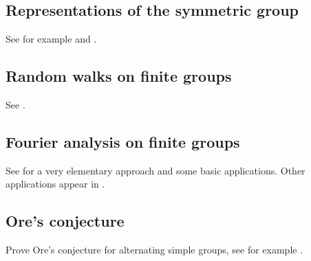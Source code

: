 \subsection*{Representations of the symmetric group}

See for example \cite[\S10]{MR2867444} and 
\cite{MR1153249}. 

\subsection*{Random walks on finite groups}

See \cite[\S11]{MR2867444}.

\subsection*{Fourier analysis on finite groups}

See \cite[\S5]{MR2867444} for a very elementary approach and some
basic applications. Other applications 
appear in \cite{MR1695775}.

\subsection*{Ore's conjecture}

Prove Ore's conjecture for alternating simple groups,
see for example \cite{MR40298}. 